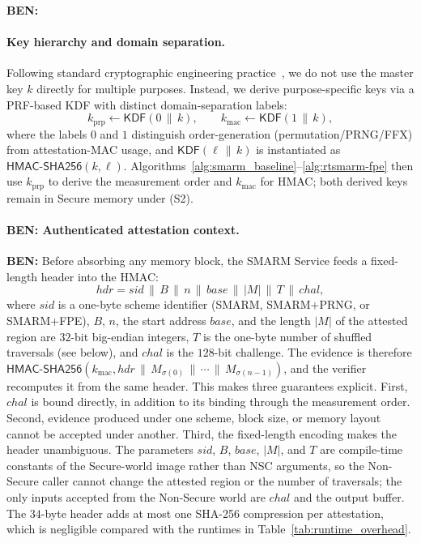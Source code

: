 \documentclass{ieeeaccess}
\DeclareRobustCommand{\ben}[1]{{\color{BENcolor}\textbf{BEN:} #1}}
\newcommand{\rtsmarmone}{SMARM+PRNG\xspace}
\newcommand{\rtsmarmtwo}{SMARM+FPE\xspace}
\begin{document}
\ben{\paragraph{Key hierarchy and domain separation.}
Following standard cryptographic engineering practice~\cite{krawczyk2010hkdf,nist-sp800-108}, we do not use the master key $k$ directly for multiple purposes.
Instead, we derive purpose-specific keys via a PRF-based KDF with distinct domain-separation labels:
\[
  k_{\mathrm{prp}} \gets \mathsf{KDF}(0 \,\|\, k),
  \qquad
  k_{\mathrm{mac}} \gets \mathsf{KDF}(1 \,\|\, k),
\]
where the labels $0$ and $1$ distinguish order-generation (permutation/PRNG/FFX) from attestation-MAC usage, and $\mathsf{KDF}(\ell \,\|\, k)$ is instantiated as $\mathsf{HMAC\text{-}SHA256}(k,\ell)$.
Algorithms~\ref{alg:smarm_baseline}--\ref{alg:rtsmarm-fpe} then use $k_{\mathrm{prp}}$ to derive the measurement order and $k_{\mathrm{mac}}$ for HMAC; both derived keys remain in Secure memory under (S2).}

\paragraph{\ben{Authenticated attestation context.}}
\ben{Before absorbing any memory block, the SMARM Service feeds a fixed-length header into the HMAC:
\[
  \mathit{hdr} = \mathit{sid} \,\|\, B \,\|\, n \,\|\, \mathit{base} \,\|\, |M| \,\|\, T \,\|\, chal,
\]
where $\mathit{sid}$ is a one-byte scheme identifier (SMARM, \rtsmarmone, or \rtsmarmtwo), $B$, $n$, the start address $\mathit{base}$, and the length $|M|$ of the attested region are $32$-bit big-endian integers, $T$ is the one-byte number of shuffled traversals (see below), and $chal$ is the $128$-bit challenge.
The evidence is therefore $\mathsf{HMAC\text{-}SHA256}(k_{\mathrm{mac}}, \mathit{hdr} \,\|\, M_{\sigma(0)} \,\|\, \cdots \,\|\, M_{\sigma(n-1)})$, and the verifier recomputes it from the same header.
This makes three guarantees explicit.
First, $chal$ is bound directly, in addition to its binding through the measurement order.
Second, evidence produced under one scheme, block size, or memory layout cannot be accepted under another.
Third, the fixed-length encoding makes the header unambiguous.
The parameters $\mathit{sid}$, $B$, $\mathit{base}$, $|M|$, and $T$ are compile-time constants of the Secure-world image rather than NSC arguments, so the Non-Secure caller cannot change the attested region or the number of traversals; the only inputs accepted from the Non-Secure world are $chal$ and the output buffer.
The $34$-byte header adds at most one SHA-256 compression per attestation, which is negligible compared with the runtimes in Table~\ref{tab:runtime_overhead}.}
\end{document}
